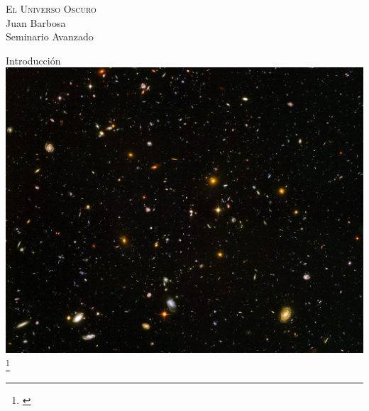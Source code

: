 \documentclass[handout]{beamer}
\newcommand\blfootnote[1]
{%
	\begingroup
	\renewcommand\thefootnote{}\footnote{#1}%
	\addtocounter{footnote}{-1}%
	\endgroup
}
\newcommand{\fcite}[1]{\blfootnote{\cite{#1}}}
\begin{document}
{
	\begin{frame}
		\centering
		\color{white}
		\textsc{\Huge El Universo Oscuro}
		\\
		\vspace{5cm}
		\raggedleft Juan Barbosa\\
		\raggedleft Seminario Avanzado
	\end{frame}
}

\begin{frame}{Introducci\'on}
	\centering
	\includegraphics[height = 0.7\textheight]{sources/images/universe.jpg}
	\fcite{boker2002hubble}
\end{frame}
\end{document}
